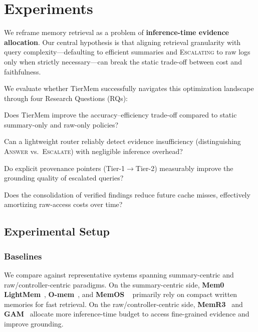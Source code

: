 \documentclass{article}
\theoremstyle{plain}
\theoremstyle{definition}
\theoremstyle{remark}
\begin{document}
\section{Experiments}
\label{sec:experiments}

We reframe memory retrieval as a problem of \textbf{inference-time evidence allocation}.
Our central hypothesis is that aligning retrieval granularity with query complexity—defaulting to efficient summaries and \textsc{Escalating} to raw logs only when strictly necessary—can break the static trade-off between cost and faithfulness.

We evaluate whether TierMem successfully navigates this optimization landscape through four Research Questions (RQs):

\begin{description}[style=unboxed, leftmargin=0cm, font=\bfseries]
    \item[RQ1 (Trade-off):] Does TierMem improve the accuracy--efficiency trade-off compared to static summary-only and raw-only policies?

    \item[RQ2 (Control Mechanism):] Can a lightweight router reliably detect evidence insufficiency (distinguishing \textsc{Answer} vs.\ \textsc{Escalate}) with negligible inference overhead?
    \item[RQ3 (Structural Utility):] Do explicit provenance pointers (Tier-1$\rightarrow$Tier-2) measurably improve the grounding quality of escalated queries?
    \item[RQ4 (Online Amortization):] Does the consolidation of verified findings reduce future cache misses, effectively amortizing raw-access costs over time?
\end{description}

\subsection{Experimental Setup}
\label{sec:exp_setup}

\subsubsection{Baselines}
\label{sec:baselines}
We compare against representative systems spanning summary-centric and raw/controller-centric paradigms.
On the summary-centric side, \textbf{Mem0}~\cite{chhikara_mem0_2025} \textbf{LightMem}~\cite{fang_lightmem_2025}, \textbf{O-mem}~\cite{wang2025omemomnimemorypersonalized}, and \textbf{MemOS} ~\cite{li_memos_2025} primarily rely on compact written memories for fast retrieval.
On the raw/controller-centric side, \textbf{MemR3}~\cite{du_memr3_2025} and \textbf{GAM}~\cite{yan_general_2025} allocate more inference-time budget to access fine-grained evidence and improve grounding.
\end{document}

